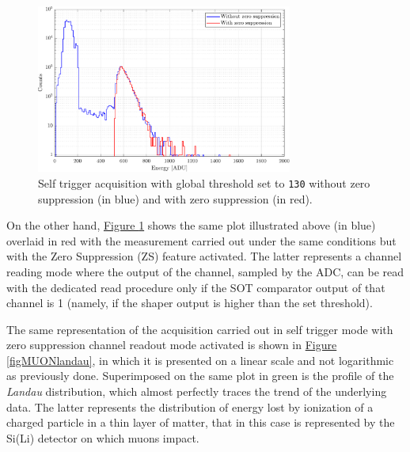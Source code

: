 \begin{figure}[h!]
    \centering
    \includegraphics[width=0.75\textwidth]{Images/chap3/results/muons/incoming_energy_zero_suppr_thr130.pdf}
    \caption{Self trigger acquisition with global threshold set to \texttt{130} without zero suppression (in blue) and with zero suppression (in red).}
    \label{figMUONselfZS}
\end{figure}

\par
On the other hand, \hyperref[figMUONselfZS]{Figure \ref{figMUONselfZS}} shows the same plot illustrated above (in blue) overlaid in red with the measurement carried out under the same conditions but with the Zero Suppression (ZS) feature activated. The latter represents a channel reading mode where the output of the channel, sampled by the ADC, can be read with the dedicated read procedure only if the SOT comparator output of that channel is 1 (namely, if the shaper output is higher than the
set threshold).

\par
The same representation of the acquisition carried out in self trigger mode with zero suppression channel readout mode activated is shown in \hyperref[figMUONlandau]{Figure \ref{figMUONlandau}}, in which it is presented on a linear scale and not logarithmic as previously done. Superimposed on the same plot in green is the profile of the \textit{Landau} distribution, which almost perfectly traces the trend of the underlying data. The latter represents the distribution of energy lost by ionization of a charged particle in a thin layer of matter, that in this case is represented by the Si(Li) detector on which muons impact.

